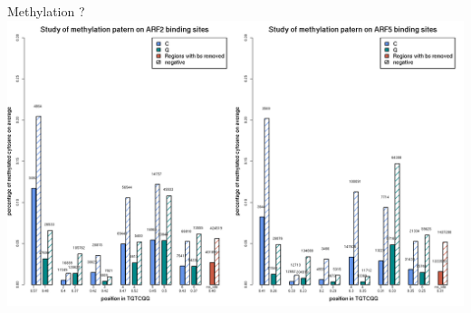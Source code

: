 \documentclass{beamer}
\begin{document}
\begin{frame}{Methylation ? }
  \includegraphics[width=1\textwidth,height=0.90\textheight,center]{ARF2_ARF5_methylation_and_sample_sizes_v3.png}
\end{frame}
\end{document}
